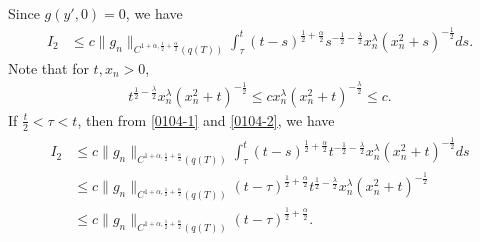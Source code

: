 \documentclass{amsart}
\numberwithin{equation}{section}
\newcommand {\la}{\lambda}
\newcommand {\al}{\alpha}
\begin{document}
Since $g(y', 0) = 0$, we have 
\begin{align}\label{0104-1}
I_2 &\leq c \| g_n \|_{C^{1 +\al, \frac12 + \frac{\al}2}(q(T))} \int_\tau^t (t -s)^{\frac12 + \frac{\al}2} s^{-\frac12 -\frac{\la}2} x_n^\la (x_n^2 + s)^{-\frac12} ds.
\end{align}
Note that for $t, x_n > 0$, 
\begin{align}\label{0104-2}
 t^{\frac12 -\frac{\la}2} x_n^\la (x_n^2 + t)^{-\frac12} \leq c x_n^\la (x_n^2 + t)^{-\frac{\la}2} \leq c.
\end{align}
If $\frac{t}2 < \tau < t$, then from \eqref{0104-1} and \eqref{0104-2}, we have 
\begin{align*}
\begin{split}
I_2 &\leq c \| g_n \|_{C^{1 +\al, \frac12 + \frac{\al}2}(q(T))} \int_\tau^t (t -s)^{\frac12 + \frac{\al}2} t^{-\frac12 -\frac{\la}2} x_n^\la (x_n^2 + t)^{-\frac12} ds \\
&\leq c \| g_n \|_{C^{1 +\al, \frac12 + \frac{\al}2}(q(T))} (t -\tau)^{\frac12 + \frac{\al}2} t^{\frac12 -\frac{\la}2} x_n^\la (x_n^2 + t)^{-\frac12} \\
&\leq c \| g_n \|_{C^{1 +\al, \frac12 + \frac{\al}2}(q(T))} (t -\tau)^{\frac12 + \frac{\al}2}.
\end{split}
\end{align*}
\end{document}
